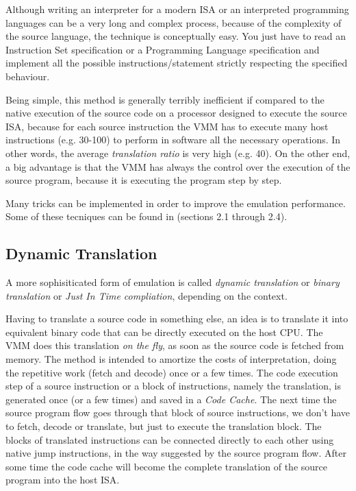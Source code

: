 \vspace{0.5cm}

Although writing an interpreter for a modern ISA or an interpreted programming languages can be a very long and complex process,
because of the complexity of the source language, the technique is conceptually easy. You just have to read an Instruction Set 
specification or a Programming Language specification and implement all the possible instructions/statement strictly respecting
the specified behaviour.

Being simple, this method is generally terribly inefficient if compared to the native execution of the source code on a processor
designed to execute the source ISA, because for each source instruction the VMM has to execute many host instructions (e.g. 30-100)
to perform in software all the necessary operations. In other words, the average \emph{translation ratio} is very high (e.g. 40).
On the other end, a big advantage is that the VMM has always the control over the execution of the source program, because it is 
executing the program step by step.

Many tricks can be implemented in order to improve the emulation performance. Some of these tecniques can be found in \cite{ref:vmbook}
(sections 2.1 through 2.4).


\subsection{Dynamic Translation}
A more sophisiticated form of emulation is called \emph{dynamic translation} or \emph{binary translation} or 
\emph{Just In Time compliation}, depending on the context.

Having to translate a source code in something else, an idea is to translate it into equivalent binary code that can be directly
executed on the host CPU. The VMM does this translation \emph{on the fly}, as soon as the source code is fetched from memory.
The method is intended to amortize the costs of interpretation, doing the repetitive work (fetch and decode) once or a few
times. 
The code execution step of a source instruction or a block of instructions, namely the translation, is generated once (or a few times)
and saved in a \emph{Code Cache}. The next time the source program flow goes through that block of source instructions, we don't have
to fetch, decode or translate, but just to execute the translation block.
The blocks of translated instructions can be connected directly to each other using native jump instructions, 
in the way suggested by the source program flow. After some time the code cache will become the complete translation of the source program
into the host ISA.

